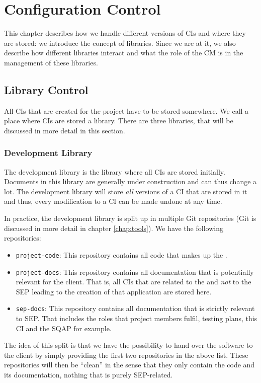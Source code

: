 \chapter{Configuration Control}
\label{chap:configurationcontrol}
This chapter describes how we handle different versions of CIs and where they are stored: we introduce the concept of libraries. Since we are at it, we also describe how different libraries interact and what the role of the CM is in the management of these libraries.

\section{Library Control}
\label{sec:configcontrol-library}
All CIs that are created for the \projectname{} project have to be stored somewhere. We call a place where CIs are stored a library. There are three libraries, that will be discussed in more detail in this section.

\subsection{Development Library}
\label{subsec:configcontrol-library-dev}
The development library is the library where all CIs are stored initially. Documents in this library are generally under construction and can thus change a lot. The development library will store \emph{all} versions of a CI that are stored in it and thus, every modification to a CI can be made undone at any time.

In practice, the development library is split up in multiple Git repositories (Git is discussed in more detail in chapter \ref{chap:tools}). We have the following repositories:
\begin{itemize}
	\item \texttt{project-code}: This repository contains all code that makes up the \applicationname{}.
	\item \texttt{project-docs}: This repository contains all documentation that is potentially relevant for the client. That is, all CIs that are related to the \applicationname{} and \emph{not} to the SEP leading to the creation of that application are stored here.
	\item \texttt{sep-docs}: This repository contains all documentation that is strictly relevant to SEP. That includes the roles that project members fulfil,  testing plans, this CI and the SQAP for example.
\end{itemize}
The idea of this split is that we have the possibility to hand over the software to the client by simply providing the first two repositories in the above list. These repositories will then be ``clean'' in the sense that they only contain the code and its documentation, nothing that is purely SEP-related.

